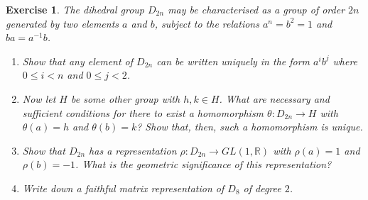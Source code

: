 \documentclass{article}
\newtheorem{exercise}[theorem]{Exercise}
\begin{document}
\begin{exercise}
The dihedral group $D_{2n}$ may be characterised as a group of order $2n$ generated by two elements $a$ and $b$, subject to the relations $a^n=b^2=1$ and $ba=a^{-1}b$.
\begin{enumerate}[label=(\roman*)]
    \item Show that any element of $D_{2n}$ can be written uniquely in the form $a^ib^j$ where $0\leq i<n$ and $0\leq j<2$.
    \item Now let $H$ be some other group with $h,k\in H$. What are necessary and sufficient conditions for there to exist a homomorphism $\theta:D_{2n}\to H$ with $\theta(a)=h$ and $\theta(b)=k$? Show that, then, such a homomorphism is unique.
    \item Show that $D_{2n}$ has a representation $\rho:D_{2n}\to GL(1,\mathbb{R})$ with $\rho(a)=1$ and $\rho(b)=-1$. What is the geometric significance of this representation?
    \item Write down a faithful matrix representation of $D_8$ of degree $2$.
\end{enumerate}
\end{exercise}
\end{document}
